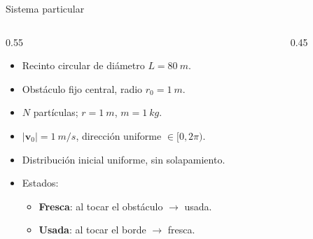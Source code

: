 \documentclass[10pt,aspectratio=169]{beamer}
\newcommand{\vect}[1]{\mathbf{#1}}
\begin{document}
\begin{frame}{Sistema particular}
    \begin{columns}[T]
        \begin{column}{0.55\textwidth}
            \begin{itemize}\setlength\itemsep{2pt}
                \item Recinto circular de diámetro $L = \SI{80}{m}$.
                \item Obstáculo fijo central, radio $r_0 = \SI{1}{m}$.
                \item $N$ partículas; $r = \SI{1}{m}$, $m = \SI{1}{kg}$.
                \item $|\vect{v}_0| = \SI{1}{m/s}$, dirección uniforme $\in [0,2\pi)$.
                \item Distribución inicial uniforme, sin solapamiento.
                \item Estados:
                \begin{itemize}
                    \item \textcolor{green!55!black}{\textbf{Fresca}}: al tocar el obstáculo $\rightarrow$ usada.
                    \item \textcolor{violet!70!black}{\textbf{Usada}}: al tocar el borde $\rightarrow$ fresca.
                \end{itemize}
            \end{itemize}
        \end{column}
        \begin{column}{0.45\textwidth}
            \centering
        \end{column}
    \end{columns}
\end{frame}
\end{document}
